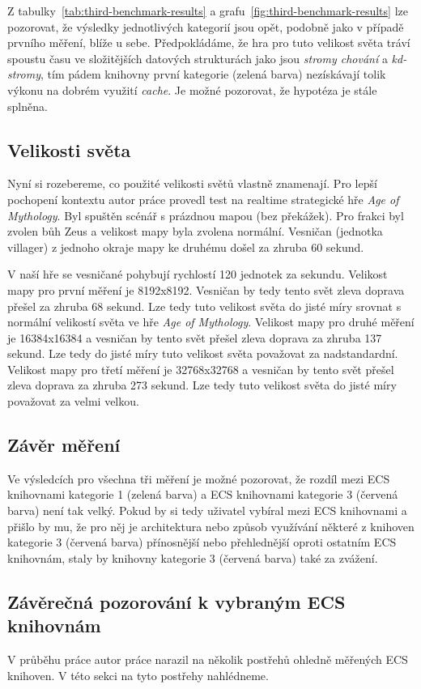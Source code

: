 Z tabulky~\ref{tab:third-benchmark-results} a grafu~\ref{fig:third-benchmark-results} lze pozorovat, že výsledky jednotlivých kategorií jsou opět, podobně jako v případě prvního měření, blíže u sebe. Předpokládáme, že hra pro tuto velikost světa tráví spoustu času ve složitějších datových strukturách jako jsou \textit{stromy chování} a \textit{kd-stromy}, tím pádem knihovny první kategorie (zelená barva) nezískávají tolik výkonu na dobrém využití \textit{cache}. Je možné pozorovat, že hypotéza je stále splněna.

\subsection{Velikosti světa}
Nyní si rozebereme, co použité velikosti světů vlastně znamenají. Pro lepší pochopení kontextu autor práce provedl test na realtime strategické hře \textit{Age of Mythology}. Byl spuštěn scénář s prázdnou mapou (bez překážek). Pro frakci byl zvolen bůh Zeus a velikost mapy byla zvolena normální. Vesničan (jednotka villager) z jednoho okraje mapy ke druhému došel za zhruba 60 sekund.

V naší hře se vesničané pohybují rychlostí 120 jednotek za sekundu. Velikost mapy pro první měření je 8192x8192. Vesničan by tedy tento svět zleva doprava přešel za zhruba 68 sekund. Lze tedy tuto velikost světa do jisté míry srovnat s normální velikostí světa ve hře \textit{Age of Mythology}. Velikost mapy pro druhé měření je 16384x16384 a vesničan by tento svět přešel zleva doprava za zhruba 137 sekund. Lze tedy do jisté míry tuto velikost světa považovat za nadstandardní. Velikost mapy pro třetí měření je 32768x32768 a vesničan by tento svět přešel zleva doprava za zhruba 273 sekund. Lze tedy tuto velikost světa do jisté míry považovat za velmi velkou.

\subsection{Závěr měření}
Ve výsledcích pro všechna tři měření je možné pozorovat, že rozdíl mezi ECS knihovnami kategorie 1 (zelená barva) a ECS knihovnami kategorie 3 (červená barva) není tak velký. Pokud by si tedy uživatel vybíral mezi ECS knihovnami a přišlo by mu, že pro něj je architektura nebo způsob využívání některé z knihoven kategorie 3 (červená barva) přínosnější nebo přehlednější oproti ostatním ECS knihovnám, staly by knihovny kategorie 3 (červená barva) také za zvážení.

\subsection{Závěrečná pozorování k vybraným ECS knihovnám}
V průběhu práce autor práce narazil na několik postřehů ohledně měřených ECS knihoven. V této sekci na tyto postřehy nahlédneme.

